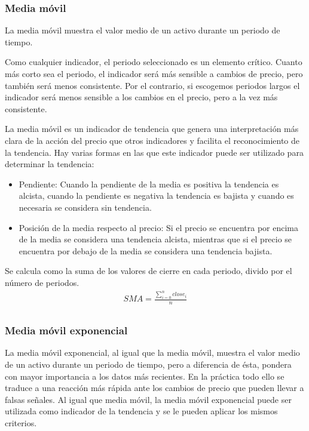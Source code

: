 
\pagebreak

\subsubsection*{Media móvil}

La media móvil muestra el valor medio de un activo durante un periodo de tiempo.

Como cualquier indicador, el periodo seleccionado es un elemento crítico. Cuanto más corto sea el periodo, el indicador será más sensible a cambios de precio, pero también será menos consistente. Por el contrario, si escogemos periodos largos el indicador será menos sensible a los cambios en el precio, pero a la vez más consistente.

La media móvil es un indicador de tendencia que genera una interpretación más clara de la acción del precio que otros indicadores y facilita el reconocimiento de la tendencia. Hay varias formas en las que este indicador puede ser utilizado para determinar la tendencia:
\begin{itemize}
\item Pendiente: Cuando la pendiente de la media es positiva la tendencia es alcista, cuando la pendiente es negativa la tendencia es bajista y cuando es necesaria se considera sin tendencia.
\item Posición de la media respecto al precio: Si el precio se encuentra por encima de la media se considera una tendencia alcista, mientras que si el precio se encuentra por debajo de la media se considera una tendencia bajista.
\end{itemize}

Se calcula como la suma de los valores de cierre en cada periodo, divido por el número de periodos.
\begin{gather*}
\label{eqn:MA}
SMA = \frac{\sum_{i=0}^{n}close_{i}}{n}\\
\end{gather*}


\subsubsection*{Media móvil exponencial}
La media móvil exponencial, al igual que la media móvil, muestra el valor medio de un activo durante un periodo de tiempo, pero a diferencia de ésta, pondera con mayor importancia a los datos más recientes. En la práctica todo ello se traduce a una reacción más rápida ante los cambios de precio que pueden llevar a falsas señales. 
Al igual que media móvil, la media móvil exponencial puede ser utilizada como indicador de la tendencia y se le pueden aplicar los mismos criterios.

